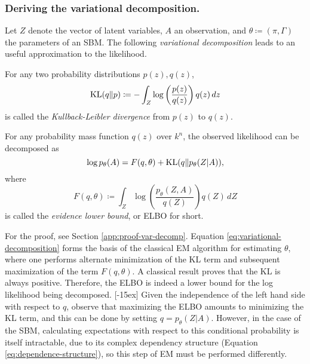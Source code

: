\documentclass[../../main.tex]{subfiles} %
\begin{document}
\subsubsection{Deriving the variational 
decomposition.}
Let \(Z\) denote the vector of latent variables, \(A\) an observation, 
and \(\theta 
\coloneqq (\pi, \Gamma)\) the parameters of an SBM. The following 
\textit{variational decomposition} leads to an useful approximation 
to the 
likelihood.

\begin{definition}
	For any two probability distributions \(p(z), q(z)\),
	\begin{equation}
		\operatorname{KL} (q \Vert p) \coloneqq -
		\int_{Z} \log \left( \frac{p (z)}{q(z)}
		\right) q(z) \, dz
	\end{equation}
	is called the \textit{Kullback-Leibler divergence} from \(p(z)\) to 
	\(q(z)\).
\end{definition}

\begin{theorem} \label{thm:var-decomp}
	For any probability mass function \(q(z)\) over \(k^n\), the observed 
	likelihood can be decomposed as
	\begin{equation}
		\log p_\theta (A) = F (q, \theta) + \operatorname{KL} (q \Vert p_\theta( Z \vert 
		A)),
		\label{eq:variational-decomposition}
	\end{equation}
	where
	\begin{equation}
		F (q, \theta) \coloneqq \int_{Z} \log \left(
		\frac{p_\theta \left( Z, A\right)}{q(Z)} \right) q(Z) \, dZ
	\end{equation}
	is called the \textit{evidence lower bound}, or ELBO for short.
\end{theorem}

For the proof, see Section \ref{app:proof-var-decomp}. Equation 
\eqref{eq:variational-decomposition} forms the basis of the classical 
EM algorithm for estimating \(\theta\), where one performs alternate 
minimization of the KL term and subsequent maximization of the term 
\(F \left( q, \theta \right)\). 
A classical result proves that the KL is always positive. Therefore, the ELBO 
is indeed a lower bound for the log likelihood being decomposed. 
[-15ex] 
Given the independence of the left hand side with respect to $q$, observe that 
maximizing the ELBO amounts to minimizing the KL term, and this can be 
done by 
setting \(q = p_\theta(Z \vert A)\). However, in the case of the SBM, 
calculating expectations with respect to this conditional probability is itself 
intractable, due to its complex dependency structure (Equation 
\eqref{eq:dependence-structure}), so this step of EM must be performed 
differently.
\end{document}
